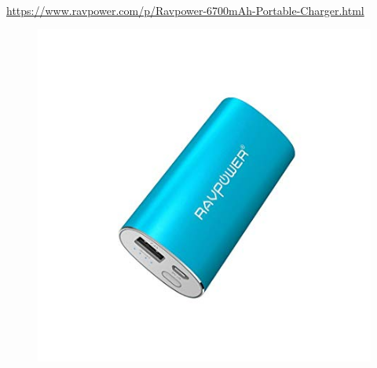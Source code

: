 \documentclass[12pt]{report}
\begin{document}
\paragraph{}
\url{https://www.ravpower.com/p/Ravpower-6700mAh-Portable-Charger.html}
\begin{figure}[H]
	\begin{center}
		\includegraphics[scale=0.6]{res/power.jpg}
	\end{center}
\end{figure}
\end{document}
